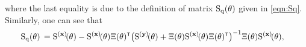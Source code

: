 where the last equality is due to  the definition of matrix ${ \mathrm{S} }_{ \mathrm{q} }(\theta)$ given in \eqref{eqn:Sq}.
Similarly, one can see that
\begin{align}        
        \Sqtheta 
        &\,= 
        \Sbfxtheta - 
        \Sbfxtheta\Xi(\vctheta)^\tr
        \big(\Sbfytheta + \Xi(\vctheta) \Sbfxtheta \Xi(\vctheta)^\tr\big)^{-1} \Xi(\vctheta)\Sbfxtheta,
        \label{eq:Sq-1}
\end{align}
%
%
%
